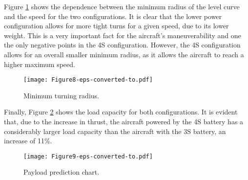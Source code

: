 \documentclass[10pt]{SelfArx} %
\begin{document}
Figure \ref{fig:curva} shows the dependence between the minimum radius of the level curve and the speed for the two configurations. It is clear that the lower power configuration allows for more tight turns for a given speed, due to its lower weight. This is a very important fact for the aircraft's maneuverability and one  the only negative points in the 4S configuration. However, the 4S configuration allows for an overall smaller minimum radius, as it allows the aircraft to reach a higher maximum speed.
\begin{figure}[htb]
	\begin{center}
	\texttt{[image: Figure8-eps-converted-to.pdf]}
	\caption{Minimum turning radius.}
	\label{fig:curva}
	\end{center}
\end{figure}

Finally, Figure \ref{fig:util} shows the load capacity for both configurations. It is evident that, due to the increase in thrust, the aircraft powered by the 4S battery has a considerably larger load capacity than the aircraft with the 3S battery, an increase of  11\%.
\begin{figure}[htb]
	\begin{center}
	\texttt{[image: Figure9-eps-converted-to.pdf]}
	\caption{Payload prediction chart.}
	\label{fig:util}
	\end{center}
\end{figure}
\end{document}

